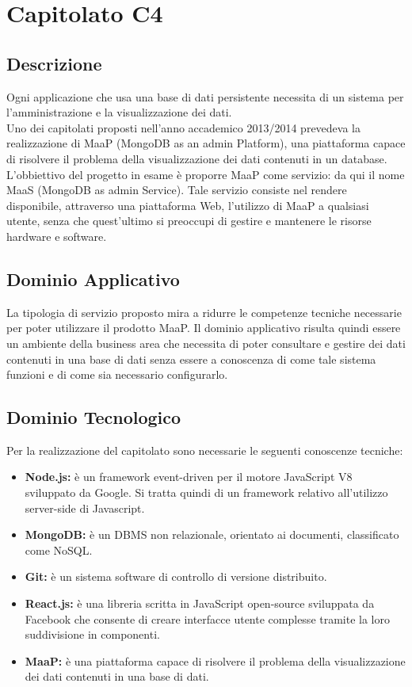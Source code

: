 \newpage
\section{Capitolato C4}
\subsection{Descrizione}
Ogni applicazione che usa una base di dati persistente necessita di un sistema per l'amministrazione e la visualizzazione dei dati.\\ Uno dei capitolati proposti nell'anno accademico 2013/2014 prevedeva la realizzazione di MaaP (MongoDB as an admin Platform), una piattaforma capace di risolvere il problema della visualizzazione dei dati contenuti in un database.\\ 
L'obbiettivo del progetto in esame è proporre MaaP come servizio: da qui il nome MaaS (MongoDB as admin Service). Tale servizio consiste nel rendere disponibile, attraverso una piattaforma Web, l'utilizzo di MaaP a qualsiasi utente, senza che quest'ultimo si preoccupi di gestire e mantenere le risorse hardware e software. 

\subsection{Dominio Applicativo}
La tipologia di servizio proposto mira a ridurre le competenze tecniche necessarie per poter utilizzare il prodotto MaaP. Il dominio applicativo risulta quindi essere un ambiente della business area che necessita di poter consultare e gestire dei dati contenuti in una base di dati senza essere a conoscenza di come tale sistema funzioni e di come sia necessario configurarlo. 

\subsection{Dominio Tecnologico}
Per la realizzazione del capitolato sono necessarie le seguenti conoscenze tecniche:
\begin{itemize}
	\item \textbf{Node.js:} è un framework event-driven per il motore JavaScript V8 sviluppato da Google. Si tratta quindi di un framework relativo all'utilizzo server-side di Javascript. 
	\item \textbf{MongoDB:} è un DBMS non relazionale, orientato ai documenti, classificato come NoSQL. 
	\item \textbf{Git:} è un sistema software di controllo di versione distribuito. 
	\item \textbf{React.js:} è una libreria scritta in JavaScript open-source sviluppata da Facebook che consente di creare interfacce utente complesse tramite la loro suddivisione in componenti. 
	\item \textbf{MaaP:} è una piattaforma capace di risolvere il problema della visualizzazione dei dati contenuti in una base di dati.	
\end{itemize}

